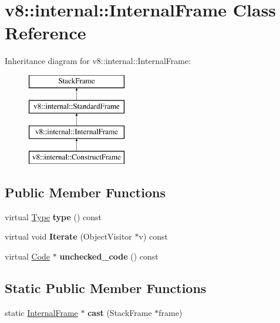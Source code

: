 \hypertarget{classv8_1_1internal_1_1_internal_frame}{}\section{v8\+:\+:internal\+:\+:Internal\+Frame Class Reference}
\label{classv8_1_1internal_1_1_internal_frame}
Inheritance diagram for v8\+:\+:internal\+:\+:Internal\+Frame\+:\begin{figure}[H]
\begin{center}
\leavevmode
\includegraphics[height=4.000000cm]{classv8_1_1internal_1_1_internal_frame}
\end{center}
\end{figure}
\subsection*{Public Member Functions}
\begin{DoxyCompactItemize}
\item 
\hypertarget{classv8_1_1internal_1_1_internal_frame_a019bf7f4868343bf35212c9271df3329}{}virtual \hyperlink{classv8_1_1internal_1_1_type_impl}{Type} {\bfseries type} () const \label{classv8_1_1internal_1_1_internal_frame_a019bf7f4868343bf35212c9271df3329}

\item 
\hypertarget{classv8_1_1internal_1_1_internal_frame_acc44dbd894912b36432d2ab68861bbbf}{}virtual void {\bfseries Iterate} (Object\+Visitor $\ast$v) const \label{classv8_1_1internal_1_1_internal_frame_acc44dbd894912b36432d2ab68861bbbf}

\item 
\hypertarget{classv8_1_1internal_1_1_internal_frame_abdf82c5119fe2f91888c74184bdae443}{}virtual \hyperlink{classv8_1_1internal_1_1_code}{Code} $\ast$ {\bfseries unchecked\+\_\+code} () const \label{classv8_1_1internal_1_1_internal_frame_abdf82c5119fe2f91888c74184bdae443}

\end{DoxyCompactItemize}
\subsection*{Static Public Member Functions}
\begin{DoxyCompactItemize}
\item 
\hypertarget{classv8_1_1internal_1_1_internal_frame_a2e3c28f5bfdf3f5387a5f774d0398271}{}static \hyperlink{classv8_1_1internal_1_1_internal_frame}{Internal\+Frame} $\ast$ {\bfseries cast} (Stack\+Frame $\ast$frame)\label{classv8_1_1internal_1_1_internal_frame_a2e3c28f5bfdf3f5387a5f774d0398271}

\end{DoxyCompactItemize}
